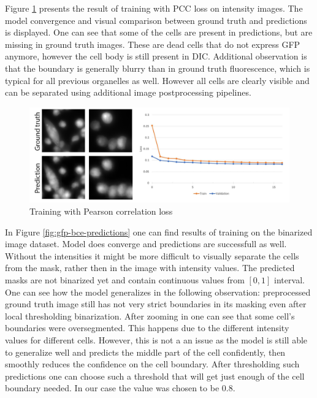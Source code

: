 Figure \ref{fig:gfp-pcc-predictions} presents the result of training with PCC loss on intensity images. The model convergence and visual comparison between ground truth and predictions is displayed. One can see that some of the cells are present in predictions, but are missing in ground truth images. These are dead cells that do not express GFP anymore, however the cell body is still present in DIC. Additional observation is that the boundary is generally blurry than in ground truth fluorescence, which is typical for all previous organelles as well. However all cells are clearly visible and can be separated using additional image postprocessing pipelines.
\begin{figure}[H]
	\begin{center}
		\includegraphics[width=0.9\linewidth]{bilder/gfp/predictions.png}
		\caption{Training with Pearson correlation loss}\label{fig:gfp-pcc-predictions}
	\end{center}
\end{figure}

In Figure \ref{fig:gfp-bce-predictions} one can find results of training on the binarized image dataset. Model does converge and predictions are successfull as well. Without the intensities it might be more difficult to visually separate the cells from the mask, rather then in the image with intensity values. The predicted masks are not binarized yet and contain continuous values from $[0, 1]$ interval. One can see how the model generalizes in the following observation: preprocessed ground truth image still has not very strict boundaries in its masking even after local thresholding binarization. After zooming in one can see that some cell's boundaries were oversegmented. This happens due to the different intensity values for different cells. However, this is not a an issue as the model is still able to generalize well and predicts the middle part of the cell confidently, then smoothly reduces the confidence on the cell boundary. After thresholding such predictions one can choose such a threshold that will get just enough of the cell boundary needed. In our case the value was chosen to be $0.8$.

